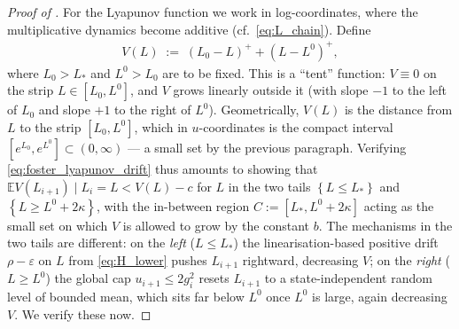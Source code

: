 \documentclass{article}
\newcommand{\Set}[1]{\left\{ #1 \right\}}
\newcommand{\Exp}[1]{\mathbb{E} #1}
\newcommand{\cond}{\mid}
\newcommand{\eps}{\varepsilon}
\begin{document}
\begin{proof}[Proof of ]
  For the Lyapunov function we work in log-coordinates, where the multiplicative dynamics become additive (cf.\ \eqref{eq:L_chain}). Define
  \begin{eqnarray*}
    V(L) \;:=\; (L_0 - L)^+ + (L - L^0)^+,
  \end{eqnarray*}
  where $L_0 > L_*$ and $L^0 > L_0$ are to be fixed. This is a ``tent'' function: $V \equiv 0$ on the strip $L \in [L_0, L^0]$, and $V$ grows linearly outside it (with slope $-1$ to the left of $L_0$ and slope $+1$ to the right of $L^0$). Geometrically, $V(L)$ is the distance from $L$ to the strip $[L_0, L^0]$, which in $u$-coordinates is the compact interval $[e^{L_0}, e^{L^0}] \subset (0,\infty)$ --- a small set by the previous paragraph. Verifying \eqref{eq:foster_lyapunov_drift} thus amounts to showing that $\Exp{V(L_{i+1}) \cond L_i = L} < V(L) - c$ for $L$ in the two tails $\Set{L \le L_*}$ and $\Set{L \ge L^0 + 2\kappa}$, with the in-between region $C := [L_*, L^0 + 2\kappa]$ acting as the small set on which $V$ is allowed to grow by the constant $b$. The mechanisms in the two tails are different: on the \emph{left} ($L \le L_*$) the linearisation-based positive drift $\rho - \eps$ on $L$ from \eqref{eq:H_lower} pushes $L_{i+1}$ rightward, decreasing $V$; on the \emph{right} ($L \ge L^0$) the global cap $u_{i+1} \le 2 g_i^2$ resets $L_{i+1}$ to a state-independent random level of bounded mean, which sits far below $L^0$ once $L^0$ is large, again decreasing $V$. We verify these now.


\end{proof}
\end{document}
